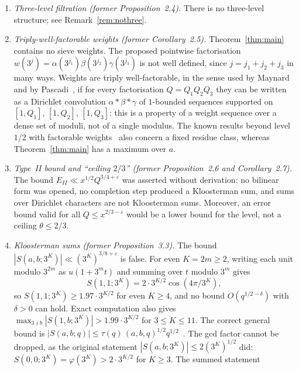 \documentclass[12pt]{amsart}
\theoremstyle{plain}
\theoremstyle{definition}
\begin{document}
\begin{enumerate}[label=(\arabic*),ref=(\arabic*)]
  \item \emph{Three-level filtration (former Proposition~2.4).} There is no
    three-level structure; see Remark~\ref{rem:nothree}.
  \item \emph{Triply-well-factorable weights (former Corollary~2.5).}
    Theorem~\ref{thm:main} contains no sieve weights. The proposed pointwise
    factorisation $w(3^j) = \alpha(3^{j_1})\beta(3^{j_2})\gamma(3^{j_3})$ is
    not well defined, since $j = j_1 + j_2 + j_3$ in many ways. Weights are
    triply well-factorable, in the sense used by Maynard and by
    Pascadi~\cite{Pascadi2025}, if for every factorisation $Q = Q_1Q_2Q_3$
    they can be written as a Dirichlet convolution $\alpha * \beta * \gamma$
    of $1$-bounded sequences supported on $[1,Q_1]$, $[1,Q_2]$, $[1,Q_3]$:
    this is a property of a weight sequence over a dense set of moduli, not
    of a single modulus. The known results beyond level $1/2$ with factorable
    weights~\cite{BFI1986,Pascadi2025} also concern a fixed residue class,
    whereas Theorem~\ref{thm:main} has a maximum over $a$.
  \item \emph{Type~II bound and ``ceiling $2/3$'' (former Proposition~2.6
    and Corollary~2.7).} The bound $E_{II} \ll x^{1/2}Q^{3/4+\varepsilon}$
    was asserted without derivation: no bilinear form was opened, no
    completion step produced a Kloosterman sum, and sums over Dirichlet
    characters are not Kloosterman sums. Moreover, an error bound valid for
    all $Q \leq x^{2/3-\varepsilon}$ would be a lower bound for the level, not
    a ceiling $\theta \leq 2/3$.
  \item \label{wd:kloosterman} \emph{Kloosterman sums (former
    Proposition~3.3).} The bound $|S(a,b;3^K)| \ll (3^K)^{3/8+\varepsilon}$ is
    false. For even $K = 2m \geq 2$, writing each unit modulo $3^{2m}$ as
    $u(1 + 3^m t)$ and summing over $t$ modulo $3^m$ gives
    \[
      S(1,1;3^{K}) = 2\cdot 3^{K/2}\cos(4\pi/3^K),
    \]
    so $S(1,1;3^K) \geq 1.97\cdot 3^{K/2}$ for even $K \geq 4$, and no bound
    $O(q^{1/2-\delta})$ with $\delta > 0$ can hold. Exact computation also
    gives $\max_{3\nmid b}|S(1,b;3^K)| > 1.99\cdot 3^{K/2}$ for
    $3 \leq K \leq 11$. The correct general bound is
    $|S(a,b;q)| \leq \tau(q)\,(a,b,q)^{1/2}q^{1/2}$~\cite[Ch.~11]{IwKow2004}.
    The gcd factor cannot be dropped, as the original statement
    $|S(a,b;3^K)| \leq 2(3^K)^{1/2}$ did: $S(0,0;3^K) = \varphi(3^K) >
    2\cdot 3^{K/2}$ for $K \geq 3$. The summed statement

\end{enumerate}
\end{document}
